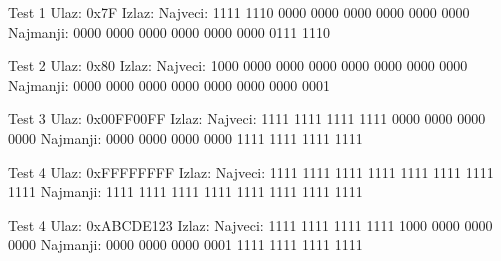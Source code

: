 \begin{Exercise}[label=004]
\begin{Exercise}[label=203]
\begin{maxitest}
\begin{test}{Test 1}
Ulaz:   0x7F  
Izlaz:  
 Najveci:
 1111 1110 0000 0000 0000 0000 0000 0000  
 Najmanji:
 0000 0000 0000 0000 0000 0000 0111 1110
\end{test}
\end{maxitest}

\begin{maxitest}
\begin{test}{Test 2}
Ulaz:   0x80
Izlaz:  
 Najveci:
 1000 0000 0000 0000 0000 0000 0000 0000  
 Najmanji:
 0000 0000 0000 0000 0000 0000 0000 0001
\end{test}
\end{maxitest}

\begin{maxitest}
\begin{test}{Test 3}
Ulaz:   0x00FF00FF
Izlaz:  
 Najveci:
 1111 1111 1111 1111 0000 0000 0000 0000  
 Najmanji:
 0000 0000 0000 0000 1111 1111 1111 1111
\end{test}
\end{maxitest}

\begin{maxitest}
\begin{test}{Test 4}
Ulaz:   0xFFFFFFFF
Izlaz:  
 Najveci:
 1111 1111 1111 1111 1111 1111 1111 1111   
 Najmanji:
 1111 1111 1111 1111 1111 1111 1111 1111
\end{test}
\end{maxitest}

\begin{maxitest}
\begin{test}{Test 4}
Ulaz:   0xABCDE123
Izlaz:  
 Najveci:
 1111 1111 1111 1111 1000 0000 0000 0000  
 Najmanji:
 0000 0000 0000 0001 1111 1111 1111 1111
\end{test}
\end{maxitest}

\end{Exercise}
\begin{Answer}[ref=203]
\end{Answer}



\end{Exercise}
